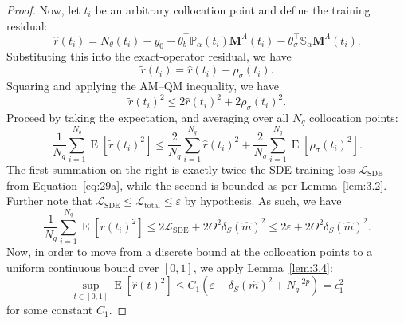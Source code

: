 \documentclass[11pt, a4paper]{article}
\theoremstyle{theoremstyle}
\theoremstyle{definitionstyle}
\DeclareMathOperator{\EE}{\mathrm E}
\begin{document}
\begin{proof}
    Now, let \(t_i\) be an arbitrary collocation point and define the training residual:
    \begin{equation}
        \hat r (t_i) = N_\theta(t_i) - y_0 - \theta_b^\top \mathbb P_\alpha(t_i)\mathbf M^\Lambda (t_i) - \theta_\sigma^\top \mathbb S_\alpha \mathbf M^\Lambda(t_i).
    \end{equation}
    Substituting this into the exact-operator residual, we have
    \begin{equation}
        \tilde r(t_i) = \hat r(t_i) - \rho_\sigma(t_i).
    \end{equation}
    Squaring and applying the AM--QM inequality, we have
    \begin{equation}
        \tilde r(t_i)^2 \leq 2\hat r(t_i)^2 + 2\rho_\sigma(t_i)^2.
    \end{equation}
    Proceed by taking the expectation, and averaging over all \(N_q\) collocation points:
    \begin{equation}
        \frac 1{N_q} \sum_{i=1}^{N_q} \EE [ \tilde r(t_i)^2 ] \leq \frac 2{N_q} \sum_{i=1}^{N_q} \hat r(t_i)^2 + \frac 2{N_q} \sum_{i=1}^{N_q} \EE [\rho_\sigma(t_i)^2].
    \end{equation}
    The first summation on the right is exactly twice the SDE training loss \(\mathcal L_{\mathrm{SDE}}\) from Equation~\ref{eq:29a}, while the second is bounded as per Lemma~\ref{lem:3.2}. Further note that \(\mathcal L_{\mathrm{SDE}} \leq \mathcal L_{\mathrm{total}} \leq \varepsilon\) by hypothesis. As such, we have
    \begin{equation}\label{eq:50}
        \frac 1{N_q} \sum_{i=1}^{N_q} \EE[\tilde r(t_i)^2] \leq 2\mathcal L_{\mathrm{SDE}} + 2\Theta^2 \delta_S(\hat m)^2 \leq 2\varepsilon + 2\Theta^2 \delta_S(\hat m)^2.
    \end{equation}
    Now, in order to move from a discrete bound at the collocation points to a uniform continuous bound over \([0, 1]\), we apply Lemma~\ref{lem:3.4}:
    \begin{equation}
        \sup_{t \in [0, 1]} \EE [\hat r(t)^2] \leq C_1(\varepsilon + \delta_S(\hat m)^2 + N_q^{-2p}) = \epsilon_1^2
    \end{equation}
    for some constant \(C_1\).


\end{proof}
\end{document}
